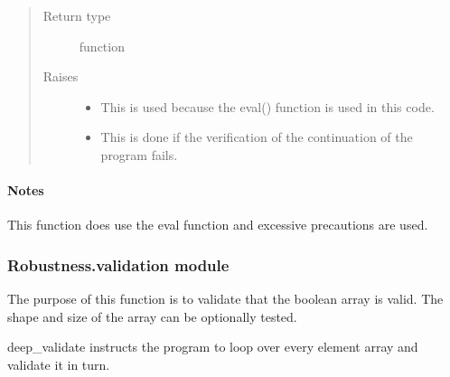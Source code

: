 \documentclass[letterpaper,10pt,english]{sphinxmanual}
\begin{document}
\begin{fulllineitems}
\begin{quote}
\begin{description}
\item[{Return type}] \leavevmode
function

\item[{Raises}] \leavevmode\begin{itemize}
\item {} 
 \textendash{} This is used because the eval() function is used in this code.

\item {} 
 \textendash{} This is done if the verification of the continuation of the program
fails.

\end{itemize}

\end{description}\end{quote}
\paragraph{Notes}

This function does use the eval function and excessive precautions are
used.

\end{fulllineitems}



\subsubsection{Robustness.validation module}
\label{\detokenize{Robustness.validation:module-Robustness.validation}}\label{\detokenize{Robustness.validation:robustness-validation-module}}\label{\detokenize{Robustness.validation::doc}}

\begin{fulllineitems}
\label{\detokenize{Robustness.validation:Robustness.validation.validate_boolean_array}}
The purpose of this function is to validate that the boolean
array is valid. The shape and size of the array can be optionally
tested.

deep\_validate instructs the program to loop over every element
array and validate it in turn.

\end{fulllineitems}
\end{document}
